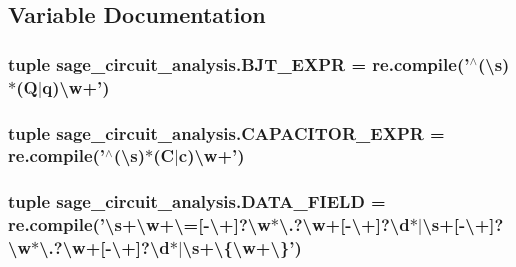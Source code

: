 \subsection{Variable Documentation}
\hypertarget{namespacesage__circuit__analysis_ad9a63538d26a69e4e17043419e7e375d}{
\subsubsection[{B\-J\-T\-\_\-\-E\-X\-P\-R}]{\setlength{\rightskip}{0pt plus 5cm}tuple sage\-\_\-circuit\-\_\-analysis.\-B\-J\-T\-\_\-\-E\-X\-P\-R = re.\-compile('$^\wedge$(\textbackslash{}s)$\ast$(Q$|$q)\textbackslash{}w+')}}\label{namespacesage__circuit__analysis_ad9a63538d26a69e4e17043419e7e375d}
\hypertarget{namespacesage__circuit__analysis_ac94c9a30cb3a3008b8cd76472bcac0b1}{
\subsubsection[{C\-A\-P\-A\-C\-I\-T\-O\-R\-\_\-\-E\-X\-P\-R}]{\setlength{\rightskip}{0pt plus 5cm}tuple sage\-\_\-circuit\-\_\-analysis.\-C\-A\-P\-A\-C\-I\-T\-O\-R\-\_\-\-E\-X\-P\-R = re.\-compile('$^\wedge$(\textbackslash{}s)$\ast$(C$|$c)\textbackslash{}w+')}}\label{namespacesage__circuit__analysis_ac94c9a30cb3a3008b8cd76472bcac0b1}
\hypertarget{namespacesage__circuit__analysis_a45b1d5b538d2ca4814b4c5be71ed415f}{
\subsubsection[{D\-A\-T\-A\-\_\-\-F\-I\-E\-L\-D}]{\setlength{\rightskip}{0pt plus 5cm}tuple sage\-\_\-circuit\-\_\-analysis.\-D\-A\-T\-A\-\_\-\-F\-I\-E\-L\-D = re.\-compile('\textbackslash{}s+\textbackslash{}w+\textbackslash{}=\mbox{[}-\/\textbackslash{}+\mbox{]}?\textbackslash{}w$\ast$\textbackslash{}.?\textbackslash{}w+\mbox{[}-\/\textbackslash{}+\mbox{]}?\textbackslash{}d$\ast$$|$\textbackslash{}s+\mbox{[}-\/\textbackslash{}+\mbox{]}?\textbackslash{}w$\ast$\textbackslash{}.?\textbackslash{}w+\mbox{[}-\/\textbackslash{}+\mbox{]}?\textbackslash{}d$\ast$$|$\textbackslash{}s+\textbackslash{}\{\textbackslash{}w+\textbackslash{}\}')}}\label{namespacesage__circuit__analysis_a45b1d5b538d2ca4814b4c5be71ed415f}
